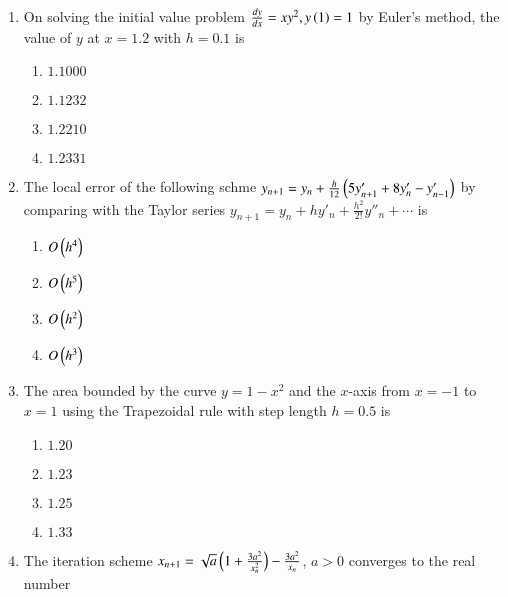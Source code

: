\documentclass[journal]{IEEEtran}
\begin{document}
\begin{enumerate}
{\begin{multicols}{4}
\begin{enumerate}
\item $y=18-3x$
\item $y=18.1-3.1x$
\item $18.2-3.2x$
\item $18.3-3.3x$
\end{enumerate}
\end{multicols}
}
\item{
On solving the initial value problem $\frac{dy}{dx}=xy^2,y\left(1\right)=1$ by Euler's method, the value of $y$ at $x=1.2$ with $h=0.1$ is
\begin{multicols}{4}
\begin{enumerate}
\item $1.1000$
\item $1.1232$
\item $1.2210$
\item $1.2331$
\end{enumerate}
\end{multicols}
}
\item{
The local error of the following schme $y_{n+1}=y_n+\frac{h}{12}\left(5y'_{n+1} + 8y'_n - y'_{n-1}\right)$ by comparing with the Taylor series $y_{n+1} = y_n + hy'_n + \frac{h^2}{2!}y''_n + \cdots$ is 
\begin{multicols}{4}
\begin{enumerate}
\item $O\left(h^4\right)$
\item $O\left(h^5\right)$
\item $O\left(h^2\right)$
\item $O\left(h^3\right)$
\end{enumerate}
\end{multicols}
}
\item{
The area bounded by the curve $y=1-x^2$ and the $x$-axis from $x=-1$ to $x=1$ using the Trapezoidal rule with step length $h=0.5$ is
\begin{multicols}{4}
\begin{enumerate}
\item $1.20$
\item $1.23$
\item $1.25$
\item $1.33$
\end{enumerate}
\end{multicols}
}
\item{
The iteration scheme $x_{n+1}=\sqrt{a}\left(1+\frac{3a^2}{x_n^2}\right)-\frac{3a^2}{x_n}$, $a>0$ converges to the real number
\begin{multicols}{4}
\begin{enumerate}

\end{enumerate}
\end{multicols}}
\end{enumerate}
\end{document}

